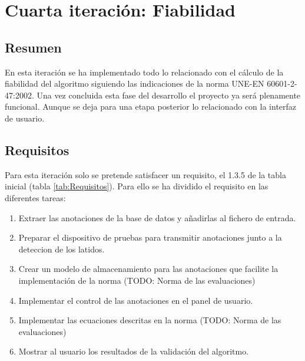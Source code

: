 
\section{Cuarta iteración: Fiabilidad}
    \subsection{Resumen}
        
        En esta iteración se ha implementado todo lo relacionado con el cálculo de la fiabilidad del algoritmo siguiendo las indicaciones de la norma UNE-EN 60601-2-47:2002. Una vez concluida esta fase del desarrollo el proyecto ya será plenamente funcional. Aunque se deja para una etapa posterior lo relacionado con la interfaz de usuario.
        
    \subsection{Requisitos}
    
        Para esta iteración solo se pretende satisfacer un requisito, el 1.3.5 de la tabla inicial (tabla \ref{tab:Requisitos}). Para ello se ha dividido el requisito en las diferentes tareas:
        
        \begin{enumerate}
            \item Extraer las anotaciones de la base de datos y añadirlas al fichero de entrada.
            \item Preparar el dispositivo de pruebas para transmitir anotaciones junto a la deteccion de los latidos.
            \item Crear un modelo de almacenamiento para las anotaciones que facilite la implementación de la norma (TODO: Norma de las evaluaciones)
            \item Implementar el control de las anotaciones en el panel de usuario.
            \item Implementar las ecuaciones descritas en la norma (TODO: Norma de las evaluaciones)
            \item Mostrar al usuario los resultados de la validación del algoritmo.
        \end{enumerate}
    
